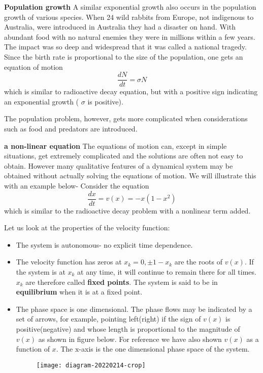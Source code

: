 \begin{example}\textbf{ Population growth}
	A similar exponential growth also occurs in the population growth of various species. When 24 wild rabbits from Europe, not indigenous to Australia, were introduced in Australia they had a disaster on hand. With abundant food with no natural enemies they were in millions within a few years. The impact was so deep
	and widespread that it was called a national tragedy. Since the birth rate is proportional to the size of the population, one gets an equation of motion
	$$
	\frac{d N}{d t}=\sigma N
	$$
	which is similar to radioactive decay equation, but with a positive sign indicating an exponential growth ( $\sigma$ is positive).
	
	The population problem, however, gets more complicated when considerations such as food and predators are introduced.
\end{example}
\begin{example}\textbf{ a non-linear equation}
	The equations of motion can, except in simple situations, get extremely complicated and the solutions are often not easy to obtain. However many qualitative features of a dynamical system may be obtained without actually solving the equations of motion. We will illustrate this with an example below- Consider the equation
	$$
	\frac{d x}{d t}=v(x)=-x\left(1-x^{2}\right)
	$$
	which is similar to the radioactive decay problem with a nonlinear term added. 
\end{example}
Let us look at the properties of the velocity function:\\
\begin{itemize}
	\item The system is autonomous- no explicit time dependence.
	\item The velocity function has zeros at $x_{k}=0, \pm 1-x_{k}$ are the roots of $v(x)$. If the system is at $x_{k}$ at any time, it will continue to remain there for all times. $x_{k}$ are therefore called \textbf{fixed points}. The system is said to be in \textbf{equilibrium} when it is at a fixed point.
	\item The phase space is one dimensional. The phase flows may be indicated by a set of arrows, for example, pointing left(right) if the sign of $v(x)$ is positive(negative) and whose length is proportional to the magnitude of $v(x)$ as shown in figure below. For reference we have also shown $v(x)$ as a function of $x$. The $\mathrm{x}$-axis is the one dimensional phase space of the system.\\
	\begin{figure}[H]
		\centering
		\texttt{[image: diagram-20220214-crop]}
		\caption{}
		\label{}
	\end{figure}
\end{itemize}
